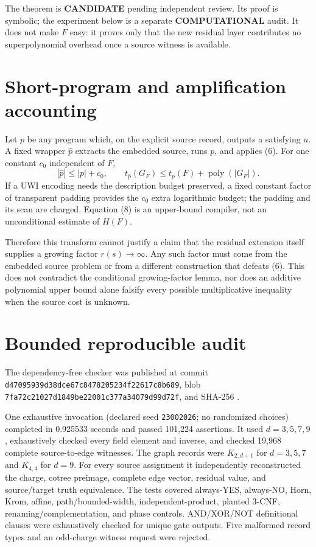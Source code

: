\documentclass[11pt]{article}
\newcommand{\COMP}{\textbf{COMPUTATIONAL}}
\newcommand{\CAND}{\textbf{CANDIDATE}}
\begin{document}
The theorem is \CAND{} pending independent review.  Its proof is symbolic;
the experiment below is a separate \COMP{} audit.  It does not make $F$ easy:
it proves only that the new residual layer contributes no superpolynomial
overhead once a source witness is available.

\section{Short-program and amplification accounting}
Let $p$ be any program which, on the explicit source record, outputs a
satisfying $u$.  A fixed wrapper $\widehat p$ extracts the embedded source,
runs $p$, and applies (6).  For one constant $c_0$ independent of $F$,
\[
 |\widehat p|\le |p|+c_0,
 \qquad
 t_{\widehat p}(G_F)
 \le t_p(F)+\operatorname{poly}(|G_F|).                \tag{8}
\]
If a UWI encoding needs the description budget preserved, a fixed constant
factor of transparent padding provides the $c_0$ extra logarithmic budget;
the padding and its scan are charged.  Equation (8) is an upper-bound
compiler, not an unconditional estimate of $H(F)$.

Therefore this transform cannot justify a claim that the residual extension
itself supplies a growing factor $r(s)\to\infty$.  Any such factor must come
from the embedded source problem or from a different construction that
defeats (6).  This does not contradict the conditional growing-factor lemma,
nor does an additive polynomial upper bound alone falsify every possible
multiplicative inequality when the source cost is unknown.

\section{Bounded reproducible audit}
The dependency-free checker
was published at commit
{\footnotesize\texttt{d47095939d38dce67c8478205234f22617c8b689}}, blob
{\footnotesize\texttt{7fa72c21027d1849be22001c377a34079d99d72f}}, and SHA-256
{\footnotesize\texttt{}}.

One exhaustive invocation (declared seed \texttt{23002026}; no randomized
choices) completed in 0.925533 seconds and passed 101,224 assertions.  It
used $d=3,5,7,9$, exhaustively checked every field element and inverse, and
checked 19,968 complete source-to-edge witnesses.  The graph records were
$K_{2,d+1}$ for $d=3,5,7$ and $K_{4,4}$ for $d=9$.  For every source
assignment it independently reconstructed the charge, cotree preimage,
complete edge vector, residual value, and source/target truth equivalence.
The tests covered always-YES, always-NO, Horn, Krom, affine, path/bounded-width,
independent-product, planted 3-CNF, renaming/complementation, and phase
controls.  AND/XOR/NOT definitional clauses were exhaustively checked for
unique gate outputs.  Five malformed record types and an odd-charge witness
request were rejected.
\end{document}
